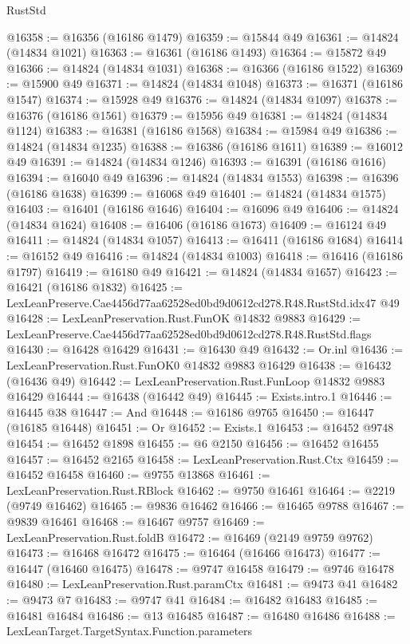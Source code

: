 \begin{lexlean}{RustStd}
\begin{coremodule}
@16358 := @16356 (@16186 @1479)
@16359 := @15844 @49
@16361 := @14824 (@14834 @1021)
@16363 := @16361 (@16186 @1493)
@16364 := @15872 @49
@16366 := @14824 (@14834 @1031)
@16368 := @16366 (@16186 @1522)
@16369 := @15900 @49
@16371 := @14824 (@14834 @1048)
@16373 := @16371 (@16186 @1547)
@16374 := @15928 @49
@16376 := @14824 (@14834 @1097)
@16378 := @16376 (@16186 @1561)
@16379 := @15956 @49
@16381 := @14824 (@14834 @1124)
@16383 := @16381 (@16186 @1568)
@16384 := @15984 @49
@16386 := @14824 (@14834 @1235)
@16388 := @16386 (@16186 @1611)
@16389 := @16012 @49
@16391 := @14824 (@14834 @1246)
@16393 := @16391 (@16186 @1616)
@16394 := @16040 @49
@16396 := @14824 (@14834 @1553)
@16398 := @16396 (@16186 @1638)
@16399 := @16068 @49
@16401 := @14824 (@14834 @1575)
@16403 := @16401 (@16186 @1646)
@16404 := @16096 @49
@16406 := @14824 (@14834 @1624)
@16408 := @16406 (@16186 @1673)
@16409 := @16124 @49
@16411 := @14824 (@14834 @1057)
@16413 := @16411 (@16186 @1684)
@16414 := @16152 @49
@16416 := @14824 (@14834 @1003)
@16418 := @16416 (@16186 @1797)
@16419 := @16180 @49
@16421 := @14824 (@14834 @1657)
@16423 := @16421 (@16186 @1832)
@16425 := LexLeanPreserve.Cae4456d77aa62528ed0bd9d0612cd278.R48.RustStd.idx47 @49
@16428 := LexLeanPreservation.Rust.FunOK @14832 @9883
@16429 := LexLeanPreserve.Cae4456d77aa62528ed0bd9d0612cd278.R48.RustStd.flags
@16430 := @16428 @16429
@16431 := @16430 @49
@16432 := Or.inl
@16436 := LexLeanPreservation.Rust.FunOK0 @14832 @9883 @16429
@16438 := @16432 (@16436 @49)
@16442 := LexLeanPreservation.Rust.FunLoop @14832 @9883 @16429
@16444 := @16438 (@16442 @49)
@16445 := Exists.intro.{1}
@16446 := @16445 @38
@16447 := And
@16448 := @16186 @9765
@16450 := @16447 (@16185 @16448)
@16451 := Or
@16452 := Exists.{1}
@16453 := @16452 @9748
@16454 := @16452 @1898
@16455 := @6 @2150
@16456 := @16452 @16455
@16457 := @16452 @2165
@16458 := LexLeanPreservation.Rust.Ctx
@16459 := @16452 @16458
@16460 := @9755 @13868
@16461 := LexLeanPreservation.Rust.RBlock
@16462 := @9750 @16461
@16464 := @2219 (@9749 @16462)
@16465 := @9836 @16462
@16466 := @16465 @9788
@16467 := @9839 @16461
@16468 := @16467 @9757
@16469 := LexLeanPreservation.Rust.foldB
@16472 := @16469 (@2149 @9759 @9762)
@16473 := @16468 @16472
@16475 := @16464 (@16466 @16473)
@16477 := @16447 (@16460 @16475)
@16478 := @9747 @16458
@16479 := @9746 @16478
@16480 := LexLeanPreservation.Rust.paramCtx
@16481 := @9473 @41
@16482 := @9473 @7
@16483 := @9747 @41
@16484 := @16482 @16483
@16485 := @16481 @16484
@16486 := @13 @16485
@16487 := @16480 @16486
@16488 := LexLeanTarget.TargetSyntax.Function.parameters

\end{coremodule}
\end{lexlean}
